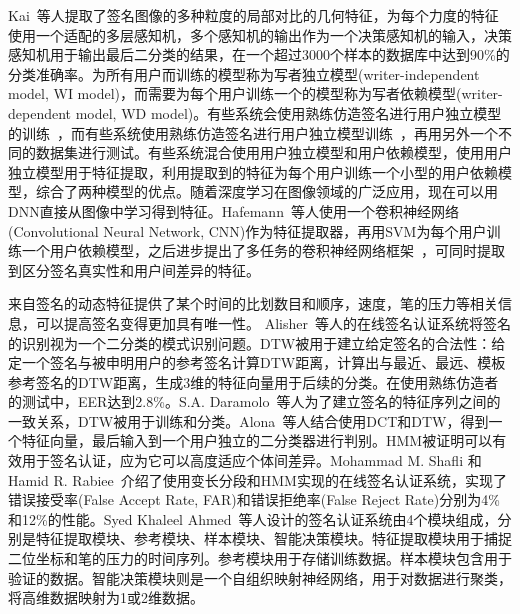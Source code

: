Kai~\cite{huang1997off}等人提取了签名图像的多种粒度的局部对比的几何特征，为每个力度的特征使用一个适配的多层感知机，多个感知机的输出作为一个决策感知机的输入，决策感知机用于输出最后二分类的结果，在一个超过3000个样本的数据库中达到90\%的分类准确率。为所有用户而训练的模型称为写者独立模型(writer-independent model, WI model)，而需要为每个用户训练一个的模型称为写者依赖模型(writer-dependent model, WD model)。有些系统会使用熟练仿造签名进行用户独立模型的训练~\cite{rivard2013multi,eskander2013hybrid}，而有些系统使用熟练仿造签名进行用户独立模型训练~\cite{yilmaz2016score,rantzsch2016signature,hafemann2017learning}，再用另外一个不同的数据集进行测试。有些系统混合使用用户独立模型和用户依赖模型，使用用户独立模型用于特征提取，利用提取到的特征为每个用户训练一个小型的用户依赖模型，综合了两种模型的优点。随着深度学习在图像领域的广泛应用，现在可以用DNN直接从图像中学习得到特征。Hafemann~\cite{hafemann2016writer}等人使用一个卷积神经网络(Convolutional Neural Network, CNN)作为特征提取器，再用SVM为每个用户训练一个用户依赖模型，之后进步提出了多任务的卷积神经网络框架~\cite{hafemann2017learning}，可同时提取到区分签名真实性和用户间差异的特征。

来自签名的动态特征提供了某个时间的比划数目和顺序，速度，笔的压力等相关信息，可以提高签名变得更加具有唯一性。 Alisher~\cite{kholmatov2005identity}等人的在线签名认证系统将签名的识别视为一个二分类的模式识别问题。DTW被用于建立给定签名的合法性：给定一个签名与被申明用户的参考签名计算DTW距离，计算出与最近、最远、模板参考签名的DTW距离，生成3维的特征向量用于后续的分类。在使用熟练仿造者的测试中，EER达到2.8\%。S.A. Daramolo~\cite{daramola2010efficient}等人为了建立签名的特征序列之间的一致关系，DTW被用于训练和分类。Alona~\cite{levy2018handwritten}等人结合使用DCT和DTW，得到一个特征向量，最后输入到一个用户独立的二分类器进行判别。HMM被证明可以有效用于签名认证，应为它可以高度适应个体间差异。Mohammad M. Shafli 和 Hamid R. Rabiee~\cite{shafiei2003new}介绍了使用变长分段和HMM实现的在线签名认证系统，实现了错误接受率(False Accept Rate, FAR)和错误拒绝率(False Reject Rate)分别为4\%和12\%的性能。Syed Khaleel Ahmed~\cite{ahmed2009automatic}等人设计的签名认证系统由4个模块组成，分别是特征提取模块、参考模块、样本模块、智能决策模块。特征提取模块用于捕捉二位坐标和笔的压力的时间序列。参考模块用于存储训练数据。样本模块包含用于验证的数据。智能决策模块则是一个自组织映射神经网络，用于对数据进行聚类，将高维数据映射为1或2维数据。%

